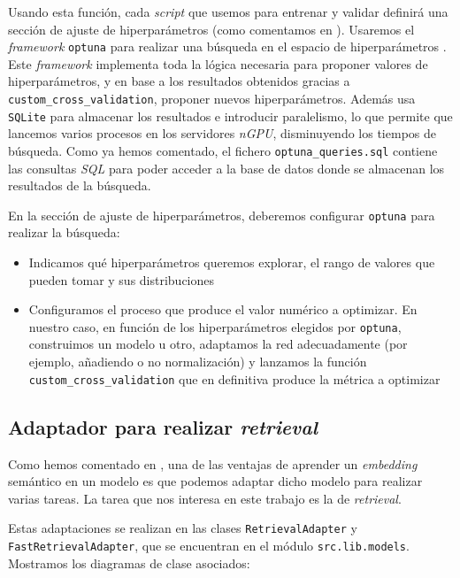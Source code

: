 Usando esta función, cada \textit{script} que usemos para entrenar y validar definirá una sección de ajuste de hiperparámetros (como comentamos en ). Usaremos el \textit{framework} \lstinline{optuna} para realizar una búsqueda en el espacio de hiperparámetros \cite{informatica:optuna_web}. Este \textit{framework} implementa toda la lógica necesaria para proponer valores de hiperparámetros, y en base a los resultados obtenidos gracias a \lstinline{custom_cross_validation}, proponer nuevos hiperparámetros. Además usa \lstinline{SQLite} para almacenar los resultados e introducir paralelismo, lo que permite que lancemos varios procesos en los servidores \textit{nGPU}, disminuyendo los tiempos de búsqueda. Como ya hemos comentado, el fichero \lstinline{optuna_queries.sql} contiene las consultas \textit{SQL} para poder acceder a la base de datos donde se almacenan los resultados de la búsqueda.

En la sección de ajuste de hiperparámetros, deberemos configurar \lstinline{optuna} para realizar la búsqueda:

\begin{itemize}
    \item Indicamos qué hiperparámetros queremos explorar, el rango de valores que pueden tomar y sus distribuciones
    \item Configuramos el proceso que produce el valor numérico a optimizar. En nuestro caso, en función de los hiperparámetros elegidos por \lstinline{optuna}, construimos un modelo u otro, adaptamos la red adecuadamente (por ejemplo, añadiendo o no normalización) y lanzamos la función \lstinline{custom_cross_validation} que en definitiva produce la métrica a optimizar
\end{itemize}

\subsection{Adaptador para realizar \textit{retrieval}}

Como hemos comentado en , una de las ventajas de aprender un \textit{embedding} semántico en un modelo es que podemos adaptar dicho modelo para realizar varias tareas. La tarea que nos interesa en este trabajo es la de \textit{retrieval}.

Estas adaptaciones se realizan en las clases \lstinline{RetrievalAdapter} y \lstinline{FastRetrievalAdapter}, que se encuentran en el módulo \lstinline{src.lib.models}. Mostramos los diagramas de clase asociados:

